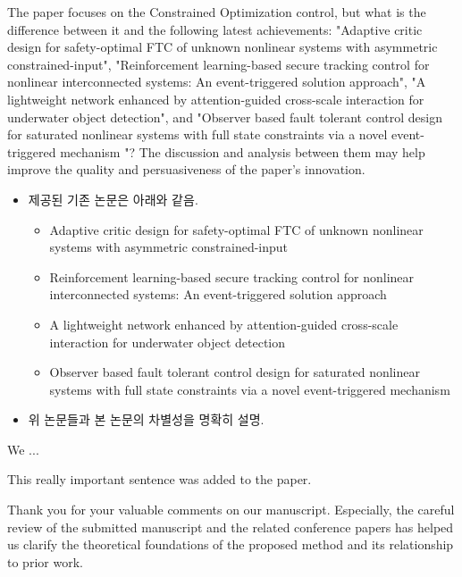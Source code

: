 \documentclass[12pt,english]{reviewresponse}
\begin{document}
% 
\begin{revcomment}[1]{}
	The paper focuses on the Constrained Optimization control, but what is the difference between it and the following latest achievements: "Adaptive critic design for safety-optimal FTC of unknown nonlinear systems with asymmetric constrained-input", "Reinforcement learning-based secure tracking control for nonlinear interconnected systems: An event-triggered solution approach", "A lightweight network enhanced by attention-guided cross-scale interaction for underwater object detection", and "Observer based fault tolerant control design for saturated nonlinear systems with full state constraints via a novel event-triggered mechanism "? The discussion and analysis between them may help improve the quality and persuasiveness of the paper's innovation.
\end{revcomment}

\begin{howtoanswer}
	\begin{itemize}
		\item 제공된 기존 논문은 아래와 같음.
		\begin{itemize}
			\item Adaptive critic design for safety-optimal FTC of unknown nonlinear systems with asymmetric constrained-input
			\item Reinforcement learning-based secure tracking control for nonlinear interconnected systems: An event-triggered solution approach
			\item A lightweight network enhanced by attention-guided cross-scale interaction for underwater object detection
			\item Observer based fault tolerant control design for saturated nonlinear systems with full state constraints via a novel event-triggered mechanism
		\end{itemize}
		\item 위 논문들과 본 논문의 차별성을 명확히 설명.
	\end{itemize}
\end{howtoanswer}

\begin{revresponse}
	We ...
	\begin{changes}
		This really important sentence was added to the paper.
	\end{changes}
\end{revresponse}

\begin{concludingresponse}[]
	Thank you for your valuable comments on our manuscript. 
  Especially, the careful review of the submitted manuscript and the related conference papers has helped us clarify the theoretical foundations of the proposed method and its relationship to prior work.
\end{concludingresponse}


\newpage

% 

\end{document}
